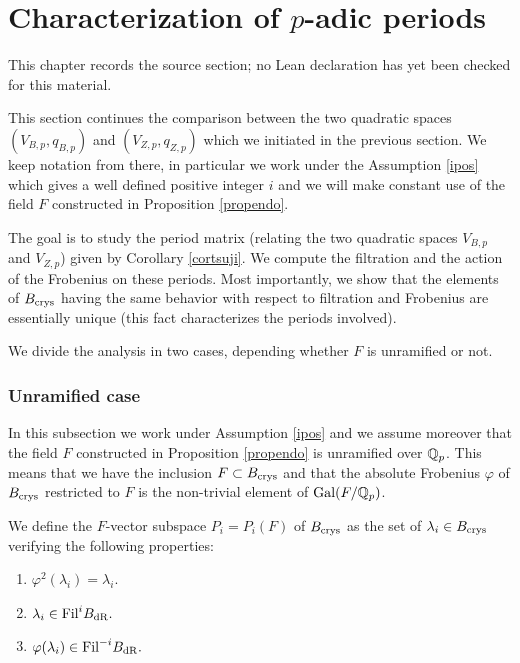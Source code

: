 \chapter{Characterization of  $p$-adic periods}
\label{standard-conjectures-abelian-fourfolds-chapter-11}

\begin{remark}
\label{standard-conjectures-abelian-fourfolds-chapter-11-source}
This chapter records the source section; no Lean declaration has yet been checked for this material.
\notready
\end{remark}

\label{p-adic periods}
This section continues the comparison between the two quadratic spaces
$(V_{B,p},q_{B,p})$ and  $(V_{Z,p},q_{Z,p})$ which we initiated in the previous section. We keep notation from there, in particular we work under the Assumption \ref{ipos} which gives a well defined positive integer $i$ and we will make constant use of the field $F$  constructed in  Proposition \ref{propendo}.

The goal is to study the period matrix (relating  the two quadratic spaces $V_{B,p}$ and $V_{Z,p}$) given by Corollary \ref{cortsuji}.
We compute  the filtration and the action of the Frobenius on these periods. Most importantly, we show that the elements of $B_{\textnormal{crys}}$ having the same behavior with respect to filtration and Frobenius are essentially unique (this fact characterizes the periods involved).

We   divide the analysis in two cases, depending  whether $F$ is unramified or not.


\subsection*{Unramified case}

In this subsection we work under   Assumption  \ref{ipos} and we assume moreover that the field $F$  constructed in  Proposition \ref{propendo} is unramified over $\mathbb{Q}_p$.
This means that we have the inclusion $F \subset B_{\textnormal{crys}}$ and that the absolute Frobenius $\varphi$ of $B_{\textnormal{crys}}$  restricted to $F$ is the  non-trivial element of $\textnormal{Gal}(F/\mathbb{Q}_p)$.
\begin{definition}
\notready\label{defpi}
We define the $F$-vector subspace $P_i=P_i(F)$ of $B_{\textnormal{crys}}$ as the set of $\lambda_i \in B_{\textnormal{crys}}$ verifying the following properties:
\begin{enumerate}
\item $\varphi^2 (\lambda_i)= \lambda_i.$
\item $\lambda_i \in \textnormal{Fil} ^i B_{\mathrm{dR}}.$
\item $\varphi(\lambda_i) \in \textnormal{Fil} ^{-i} B_{\mathrm{dR}}.$
\end{enumerate}
\end{definition}


